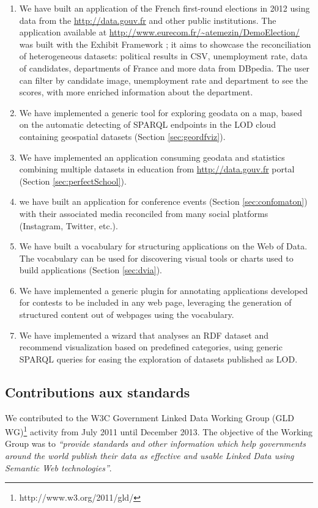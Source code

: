 \documentclass[a4paper,11pt,twoside]{report}
\begin{document}
\begin{enumerate}

\item We have built an application of the French first-round elections in 2012 using data from the \url{http://data.gouv.fr} and other public institutions. The application available at \url{http://www.eurecom.fr/~atemezin/DemoElection/} was built with the Exhibit Framework \cite{exhibit2007}; it aims to showcase the reconciliation of heterogeneous datasets: political results in CSV, unemployment rate, data of candidates, departments of France and more data from DBpedia. The user can filter by candidate image, unemployment rate and department to see the scores, with more enriched information about the department.
 
\item We have implemented a generic tool for exploring geodata on a map, based on the automatic detecting of SPARQL endpoints in the LOD cloud containing geospatial datasets (Section \ref{sec:geordfviz}). 

\item We have implemented an application consuming geodata and statistics combining multiple datasets in education from \url{http://data.gouv.fr} portal (Section \ref{sec:perfectSchool}).

\item we have built an application for conference events (Section \ref{sec:confomaton}) with their associated media reconciled from many social platforms (Instagram, Twitter, etc.).

\item We have built a vocabulary for structuring applications on the Web of Data. The vocabulary can be used for discovering visual tools or charts used to build applications (Section \ref{sec:dvia}). 

\item We have implemented a generic plugin for annotating applications developed for contests to be included in any web page, leveraging  the generation of structured content out of webpages using the vocabulary. 

\item We have implemented a wizard that analyses an RDF dataset and recommend visualization based on predefined categories, using generic SPARQL queries for easing the exploration of datasets published as LOD. 


\end{enumerate}

\subsection*{Contributions aux standards}
\label{sec:contrib-standard}
We contributed to the W3C Government Linked Data Working Group (GLD WG)\footnote{http://www.w3.org/2011/gld/} activity from July 2011 until December 2013.  The objective of the Working Group was to \textit{``provide standards and other information which help governments around the world publish their data as effective and usable Linked Data using Semantic Web technologies''}.
\end{document}
